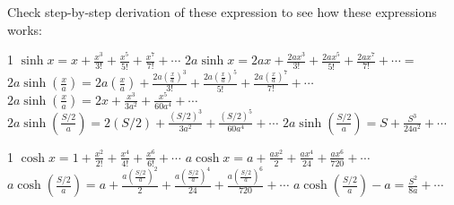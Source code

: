 \documentclass[a4paper]{article}
\begin{document}
Check step-by-step derivation of these expression to see how these expressions works:

\begin{animateinline}[controls, poster = last, loop, begin={
  \begin{tikzpicture}
  \useasboundingbox (0,-0.5) rectangle (0.5\textwidth, 0.75);
}, end={\end{tikzpicture}}]{1}
$\sinh x = x + \frac {x^3} {3!} + \frac {x^5} {5!} + \frac {x^7} {7!} +\cdots $
\newframe
$2a\sinh x = 2ax + \frac {2ax^3} {3!} + \frac {2ax^5} {5!} + \frac {2ax^7} {7!} +\cdots =$
\newframe
$2a\sinh \left(\frac{x}{a}\right) = 2a\left(\frac{x}{a}\right) + \frac {2a\left(\frac{x}{a}\right)^3} {3!} + \frac {2a\left(\frac{x}{a}\right)^5} {5!} + \frac {2a\left(\frac{x}{a}\right)^7} {7!} +\cdots$
\newframe
$2a\sinh \left(\frac{x}{a}\right) = 2x + \frac{x^3}{3a^2} + \frac{x^5}{60a^4} +\cdots$
\newframe
$2a\sinh \left(\frac{S/2}{a}\right) = 2(S/2) + \frac{(S/2)^3}{3a^2} + \frac{(S/2)^5}{60a^4} +\cdots$
\newframe
$2a\sinh \left(\frac{S/2}{a}\right) = S+ \frac{S^3}{24a^2} +\cdots$
\end{animateinline}
\begin{animateinline}[controls, poster = last, loop, begin={
  \begin{tikzpicture}
  \useasboundingbox (0,-0.5) rectangle (0.5\textwidth, 0.75);
}, end={\end{tikzpicture}}]{1}
$\cosh x = 1 + \frac {x^2} {2!} + \frac {x^4} {4!} + \frac {x^6} {6!} + \cdots$
\newframe
$a\cosh x = a + \frac {ax^2} {2} + \frac {ax^4} {24} + \frac {ax^6} {720} + \cdots$
\newframe
$a\cosh \left(\frac{S/2}{a}\right)  = a + \frac {a\left(\frac{S/2}{a}\right) ^2} {2} + \frac {a\left(\frac{S/2}{a}\right) ^4} {24} + \frac {a\left(\frac{S/2}{a}\right) ^6} {720} + \cdots$
\newframe
$a\cosh \left(\frac{S/2}{a}\right)-a  = \frac{S^2}{8a} + \cdots$
\end{animateinline}
\\ \\
\end{document}
